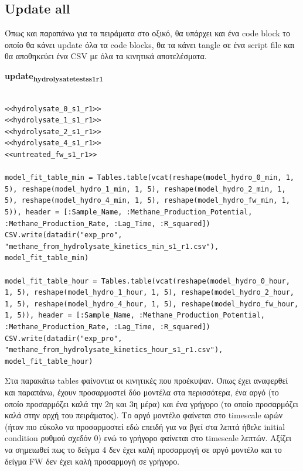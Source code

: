 \documentclass[11pt]{article}
\begin{document}
\subsection{Update all}
\label{sec:orgba86b9a}
Όπως και παραπάνω για τα πειράματα στο οξικό, θα υπάρχει και ένα code block το οποίο θα κάνει update όλα τα code blocks, θα τα κάνει tangle σε ένα script file και θα αποθηκεύει ένα CSV με όλα τα κινητικά αποτελέσματα.

\textbf{update\textsubscript{hydrolysate}\textsubscript{tests}\textsubscript{s1}\textsubscript{r1}}
\begin{verbatim}

<<hydrolysate_0_s1_r1>>
<<hydrolysate_1_s1_r1>>
<<hydrolysate_2_s1_r1>>
<<hydrolysate_4_s1_r1>>
<<untreated_fw_s1_r1>>

model_fit_table_min = Tables.table(vcat(reshape(model_hydro_0_min, 1, 5), reshape(model_hydro_1_min, 1, 5), reshape(model_hydro_2_min, 1, 5), reshape(model_hydro_4_min, 1, 5), reshape(model_hydro_fw_min, 1, 5)), header = [:Sample_Name, :Methane_Production_Potential, :Methane_Production_Rate, :Lag_Time, :R_squared])
CSV.write(datadir("exp_pro", "methane_from_hydrolysate_kinetics_min_s1_r1.csv"), model_fit_table_min)

model_fit_table_hour = Tables.table(vcat(reshape(model_hydro_0_hour, 1, 5), reshape(model_hydro_1_hour, 1, 5), reshape(model_hydro_2_hour, 1, 5), reshape(model_hydro_4_hour, 1, 5), reshape(model_hydro_fw_hour, 1, 5)), header = [:Sample_Name, :Methane_Production_Potential, :Methane_Production_Rate, :Lag_Time, :R_squared])
CSV.write(datadir("exp_pro", "methane_from_hydrolysate_kinetics_hour_s1_r1.csv"), model_fit_table_hour)
\end{verbatim}

Στα παρακάτω tables φαίνοντια οι κινητικές που προέκυψαν. Όπως έχει αναφερθεί και παραπάνω, έχουν προσαρμοστεί δύο μοντέλα στα περισσότερα, ένα αργό (το οποίο προσαρμόζει καλά την 2η και 3η μέρα) και ένα γρήγορο (το οποίο προσαρμόζει καλά στην αρχή του πειράματος). Το αργό μοντέλο φαίνεται στο timescale ωρών (ήταν πιο εύκολο να προσαρμοστεί εδώ επειδή για να βγεί στα λεπτά ήθελε initial condition ρυθμού σχεδόν 0) ενώ το γρήγορο φαίνεται στο timescale λεπτών. Αξίζει να σημειωθεί πως το δείγμα 4 δεν έχει καλή προσαρμογή σε αργό μοντέλο και το δείγμα FW δεν έχει καλή προσαρμογή σε γρήγορο. 
\end{document}
